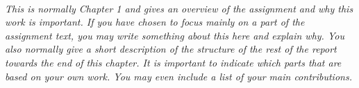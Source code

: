 \begin{comment}
This report will describe a process that has been carried out to select an appropriate HW/SW Codesign methodology for certain applications of an existing Pedestrian Detection system. The report will follow a traditional report structure. It starts with an introductory part, which will be followed by a main part in the middle, and finally a concluding part at the end. At the bottom of the report there will be an appendix containing all graphs, figures, tables etc that were deemed too comprehensive or large in size to be included in the main parts of the report. All measurements and results of the project will be described in the main part, while the concluding part will elaborate, discuss and conclude further on these topics, as well as propose recommendations for future work. 
\\\\\\\\
\end{comment}



\noindent
\textit{\color{red}\\
This is normally Chapter 1 and gives an overview of the assignment and why this work is important. If you have chosen to focus mainly on a part of the assignment text, you may write something about this here and explain why. You also normally give a short description of the structure of the rest of the report towards the end of this chapter.  It is important to indicate which parts that are based on your own work. You may even include a list of your main contributions. }\\



\clearpage